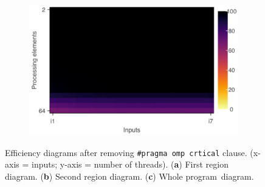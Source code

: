 \begin{figure}[H]
\begin{subfigure}[b]{0.45\textwidth}
	\end{subfigure}
	\begin{subfigure}[b]{0.45\textwidth}
		\includegraphics[width=\textwidth]{pascalanalyzer/figures/results/efficiency_rg_3.pdf}
		\label{fig:pv_regionscomparison_c_2}
	\end{subfigure}
	\caption{Efficiency diagrams after removing {\tt \#pragma~omp~crtical} clause. (x-axis = inputs; y-axis = number of threads). (\textbf{a}) First region diagram. (\textbf{b}) Second region diagram. (\textbf{c}) Whole program~diagram.}
	\label{fig:pv_regionscomparison_2}
\end{figure}
\unskip

